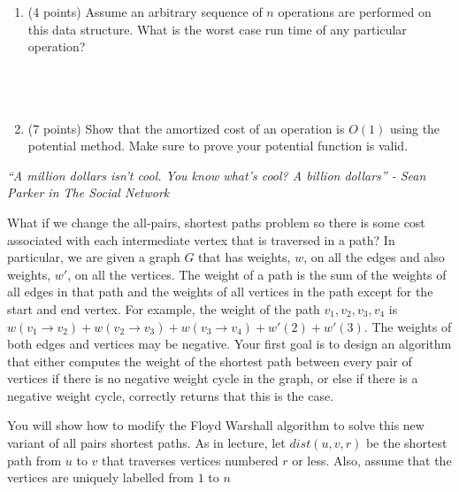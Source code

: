 \documentclass[11pt]{article}
\newcommand{\ans}[1]{ }
\begin{document}
\begin{enumerate}
\begin{enumerate}
\begin{enumerate}
\item (4 points) Assume an arbitrary sequence of $n$ operations are performed on this data structure.  What is the worst case run time of any particular operation? \ans{$\Theta(n)$.  First $n-1$ APPEND-NUMBER operations and then a MIN-MAX operation.}
\ \\ \ \\ \ \\ \ \\
\item (7 points) Show that the amortized cost of an operation is $O(1)$ using the potential method.  Make sure to prove your potential function is valid.
\ans{Let $\phi(D)$ equal the number of items in the list.  This is a valid potential function (Why?).  The amortized cost of an APPEND-NUMBER operation is then $c_{i} + \phi_{i} - \phi_{i-1} = 2$.  The amortized cost of a MIN-MAX operation is $l_{i}+(2-l_{i}) = 2$ where $l_{i}$ is the length of the list at time $i$.}
\end{enumerate}
 
\end{enumerate}

 
 
 \emph{``A million dollars isn't cool.  You know what's cool?  A billion dollars'' - Sean Parker in The Social Network}
 
What if we change the all-pairs, shortest paths problem so there is some cost associated with each intermediate vertex that is traversed in a path?  In particular, we are given a graph $G$ that has weights, $w$, on all the edges and also weights, $w'$, on all the vertices.  The weight of a path is the sum of the weights of all edges in that path and the weights of all vertices in the path except for the start and end vertex.  For example, the weight of the path $v_{1}, v_{2}, v_{3}, v_{4}$ is $w(v_{1} \rightarrow v_{2}) + w(v_{2} \rightarrow v_{3}) + w(v_{3} \rightarrow v_{4}) + w'(2) + w'(3)$.  The weights of both edges and vertices may be negative.  Your first goal is to design an algorithm that either computes the weight of the shortest path between every pair of vertices if there is no negative weight cycle in the graph, or else if there is a negative weight cycle, correctly returns that this is the case.

You will show how to modify the Floyd Warshall algorithm to solve this new variant of all pairs shortest paths.  As in lecture, let $dist(u,v,r)$ be the shortest path from $u$ to $v$ that traverses vertices numbered $r$ or less.  Also, assume that the vertices are uniquely labelled from $1$ to $n$


\end{enumerate}
\end{document}
